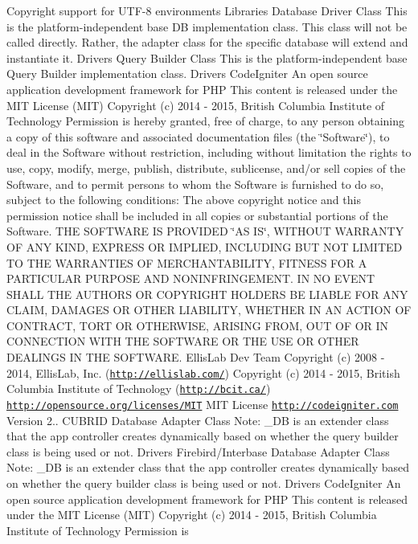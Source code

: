 \begin{DoxyCopyright}{Copyright}
support for U\+T\+F-\/8 environments  Libraries Database Driver Class This is the platform-\/independent base D\+B implementation class. This class will not be called directly. Rather, the adapter class for the specific database will extend and instantiate it.  Drivers Query Builder Class This is the platform-\/independent base Query Builder implementation class.  Drivers Code\+Igniter An open source application development framework for P\+H\+P This content is released under the M\+I\+T License (M\+I\+T) Copyright (c) 2014 -\/ 2015, British Columbia Institute of Technology Permission is hereby granted, free of charge, to any person obtaining a copy of this software and associated documentation files (the \char`\"{}\+Software\char`\"{}), to deal in the Software without restriction, including without limitation the rights to use, copy, modify, merge, publish, distribute, sublicense, and/or sell copies of the Software, and to permit persons to whom the Software is furnished to do so, subject to the following conditions\+: The above copyright notice and this permission notice shall be included in all copies or substantial portions of the Software. T\+H\+E S\+O\+F\+T\+W\+A\+R\+E I\+S P\+R\+O\+V\+I\+D\+E\+D \char`\"{}\+A\+S I\+S\char`\"{}, W\+I\+T\+H\+O\+U\+T W\+A\+R\+R\+A\+N\+T\+Y O\+F A\+N\+Y K\+I\+N\+D, E\+X\+P\+R\+E\+S\+S O\+R I\+M\+P\+L\+I\+E\+D, I\+N\+C\+L\+U\+D\+I\+N\+G B\+U\+T N\+O\+T L\+I\+M\+I\+T\+E\+D T\+O T\+H\+E W\+A\+R\+R\+A\+N\+T\+I\+E\+S O\+F M\+E\+R\+C\+H\+A\+N\+T\+A\+B\+I\+L\+I\+T\+Y, F\+I\+T\+N\+E\+S\+S F\+O\+R A P\+A\+R\+T\+I\+C\+U\+L\+A\+R P\+U\+R\+P\+O\+S\+E A\+N\+D N\+O\+N\+I\+N\+F\+R\+I\+N\+G\+E\+M\+E\+N\+T. I\+N N\+O E\+V\+E\+N\+T S\+H\+A\+L\+L T\+H\+E A\+U\+T\+H\+O\+R\+S O\+R C\+O\+P\+Y\+R\+I\+G\+H\+T H\+O\+L\+D\+E\+R\+S B\+E L\+I\+A\+B\+L\+E F\+O\+R A\+N\+Y C\+L\+A\+I\+M, D\+A\+M\+A\+G\+E\+S O\+R O\+T\+H\+E\+R L\+I\+A\+B\+I\+L\+I\+T\+Y, W\+H\+E\+T\+H\+E\+R I\+N A\+N A\+C\+T\+I\+O\+N O\+F C\+O\+N\+T\+R\+A\+C\+T, T\+O\+R\+T O\+R O\+T\+H\+E\+R\+W\+I\+S\+E, A\+R\+I\+S\+I\+N\+G F\+R\+O\+M, O\+U\+T O\+F O\+R I\+N C\+O\+N\+N\+E\+C\+T\+I\+O\+N W\+I\+T\+H T\+H\+E S\+O\+F\+T\+W\+A\+R\+E O\+R T\+H\+E U\+S\+E O\+R O\+T\+H\+E\+R D\+E\+A\+L\+I\+N\+G\+S I\+N T\+H\+E S\+O\+F\+T\+W\+A\+R\+E.  Ellis\+Lab Dev Team  Copyright (c) 2008 -\/ 2014, Ellis\+Lab, Inc. (\href{http://ellislab.com/}{\tt http\+://ellislab.\+com/})  Copyright (c) 2014 -\/ 2015, British Columbia Institute of Technology (\href{http://bcit.ca/}{\tt http\+://bcit.\+ca/})  \href{http://opensource.org/licenses/MIT}{\tt http\+://opensource.\+org/licenses/\+M\+I\+T} M\+I\+T License  \href{http://codeigniter.com}{\tt http\+://codeigniter.\+com}  Version 2..  C\+U\+B\+R\+I\+D Database Adapter Class Note\+: \+\_\+\+D\+B is an extender class that the app controller creates dynamically based on whether the query builder class is being used or not.  Drivers Firebird/\+Interbase Database Adapter Class Note\+: \+\_\+\+D\+B is an extender class that the app controller creates dynamically based on whether the query builder class is being used or not.  Drivers Code\+Igniter An open source application development framework for P\+H\+P This content is released under the M\+I\+T License (M\+I\+T) Copyright (c) 2014 -\/ 2015, British Columbia Institute of Technology Permission is 
\end{DoxyCopyright}
